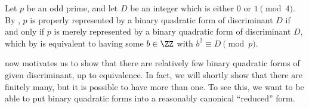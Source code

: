 \documentclass[../notes.tex]{subfiles}
\begin{document}
\begin{example}
	Let $p$ be an odd prime, and let $D$ be an integer which is either $0$ or $1\pmod4$. By , $p$ is properly represented by a binary quadratic form of discriminant $D$ if and only if $p$ is merely represented by a binary quadratic form of discriminant $D$, which by  is equivalent to having some $b\in\ZZ$ with $b^2\equiv D\pmod p$.
\end{example}
 now motivates us to show that there are relatively few binary quadratic forms of given discriminant, up to equivalence. In fact, we will shortly show that there are finitely many, but it is possible to have more than one. To see this, we want to be able to put binary quadratic forms into a reasonably canonical ``reduced'' form.
\end{document}
